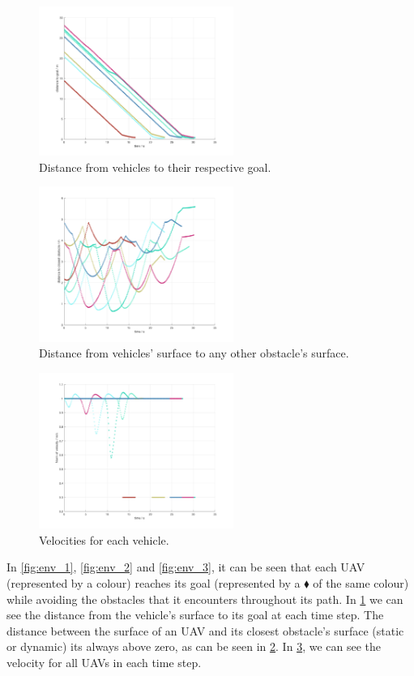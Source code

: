 \documentclass[journal]{IEEEtran}
\begin{document}
		\begin{figure}[h]
			\centering
			\includegraphics[width=2.5in]{Results/Potentialfields/goal}
			\caption{Distance from vehicles to their respective goal.}
			\label{fig:goal}
		\end{figure}
		\begin{figure}[h]
			\centering
			\includegraphics[width=2.5in]{Results/Potentialfields/obst}
			\caption{Distance from vehicles' surface to any other obstacle's surface.}
			\label{fig:obst}
		\end{figure}
	
		\begin{figure}[h]
			\centering
			\includegraphics[width=2.5in]{Results/Potentialfields/vel}
			\caption{Velocities for each vehicle.}
			\label{fig:vel}
		\end{figure}

			
		In \figurename{ \ref{fig:env_1}}, \figurename{ \ref{fig:env_2}} and \figurename{ \ref{fig:env_3}}, it can be seen that each UAV (represented by a colour) reaches its goal (represented by a $\blacklozenge$ of the same colour) while avoiding the obstacles that it encounters throughout its path. In \figurename{ \ref{fig:goal}} we can see the distance from the vehicle's surface to its goal at each time step. The distance between the surface of an UAV and its closest obstacle's surface (static or dynamic) its always above zero, as can be seen in \figurename{ \ref{fig:obst}}. In \figurename{ \ref{fig:vel}}, we can see the velocity for all UAVs in each time step.\\
		
\end{document}
